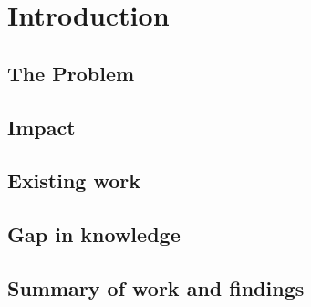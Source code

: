 \chapter{Introduction}\label{cha:intro}

\section{The Problem} %

\section{Impact}

\section{Existing work}

\section{Gap in knowledge}

\section{Summary of work and findings}